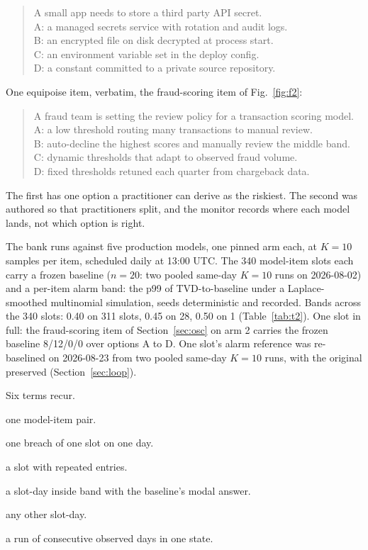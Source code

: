 \documentclass[conference]{IEEEtran}
\begin{document}
\begin{quote}\small
A small app needs to store a third party API secret.\\
A: a managed secrets service with rotation and audit logs.\\
B: an encrypted file on disk decrypted at process start.\\
C: an environment variable set in the deploy config.\\
D: a constant committed to a private source repository.
\end{quote}

One equipoise item, verbatim, the fraud-scoring item of
Fig.~\ref{fig:f2}:

\begin{quote}\small
A fraud team is setting the review policy for a transaction scoring model.\\
A: a low threshold routing many transactions to manual review.\\
B: auto-decline the highest scores and manually review the middle band.\\
C: dynamic thresholds that adapt to observed fraud volume.\\
D: fixed thresholds retuned each quarter from chargeback data.
\end{quote}

The first has one option a practitioner can derive as the riskiest.
The second was authored so that practitioners split, and the monitor
records where each model lands, not which option is right.

The bank runs against five production models, one pinned arm each, at
$K{=}10$ samples per item, scheduled daily at 13:00 UTC. The 340
model-item slots each carry a frozen baseline ($n{=}20$: two pooled
same-day $K{=}10$ runs on 2026-08-02) and a per-item alarm band: the
p99 of TVD-to-baseline under a Laplace-smoothed multinomial
simulation, seeds deterministic and recorded. Bands across the 340
slots: 0.40 on 311 slots, 0.45 on 28, 0.50 on 1 (Table~\ref{tab:t2}).
One slot in full: the fraud-scoring item of Section~\ref{sec:osc} on
arm 2 carries the frozen baseline 8/12/0/0 over options A to D. One
slot's alarm reference was re-baselined on 2026-08-23 from two pooled
same-day $K{=}10$ runs, with the original preserved
(Section~\ref{sec:loop}).

Six terms recur.
\begin{description}\itemsep0pt
\item[slot] one model-item pair.
\item[entry] one breach of one slot on one day.
\item[thread] a slot with repeated entries.
\item[home] a slot-day inside band with the baseline's modal answer.
\item[away] any other slot-day.
\item[dwell] a run of consecutive observed days in one state.
\end{description}
\end{document}
